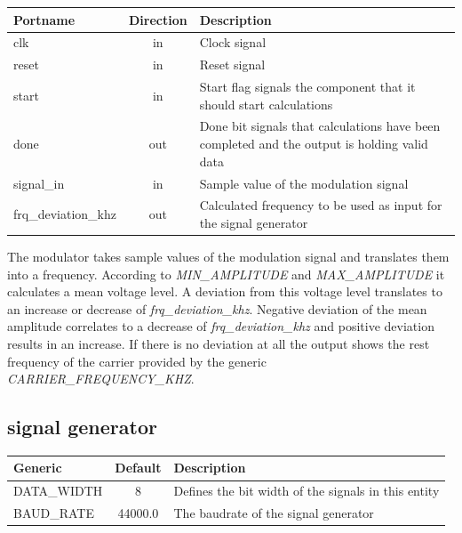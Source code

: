 \begin{adjustwidth}{-3.7cm}{}
	\begin{center}
		\begin{tabular}{ | l | c | l | }
			\hline
			\textbf{Portname} & \textbf{Direction} & \textbf{Description} \\
			\hline
			clk & in & Clock signal \\
			reset & in  & Reset signal \\
			start & in  & Start flag signals the component that it should start calculations \\
			done & out  & Done bit signals that calculations have been completed and the output is holding valid data \\
			signal\_in & in  & Sample value of the modulation signal \\
			frq\_deviation\_khz & out  & Calculated frequency to be used as input for the signal generator \\
			\hline
		\end{tabular} 
	\end{center}
\end{adjustwidth}

\vspace{4mm}

The modulator takes sample values of the modulation signal and translates them into a frequency. According to \textit{MIN\_AMPLITUDE} and \textit{MAX\_AMPLITUDE} it calculates a mean voltage level. A deviation from this voltage level translates to an increase or decrease of \textit{frq\_deviation\_khz}. Negative deviation of the mean amplitude correlates to a decrease of \textit{frq\_deviation\_khz} and positive deviation results in an increase. If there is no deviation at all the output shows the rest frequency of the carrier provided by the generic \textit{CARRIER\_FREQUENCY\_KHZ}.

\subsection{signal generator}

\begin{center}
	\begin{tabular}{ | l | c | l | }
		\hline
		\textbf{Generic} & \textbf{Default} & \textbf{Description} \\ \hline
		DATA\_WIDTH & 8 & Defines the bit width of the signals in this entity \\
		BAUD\_RATE & 44000.0 & The baudrate of the signal generator \\
		\hline
	\end{tabular} 
\end{center}



